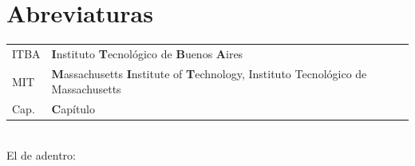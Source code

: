 \documentclass[10pt]{book}
\begin{document}
\tableofcontents 
\listoffigures			%
\listoftables			%

\chapter*{Abreviaturas}
\begin{table}[htb] 		%
	\large
	\begin{tabular}{l l}
		ITBA & \textbf{I}nstituto \textbf{T}ecnológico de \textbf{B}uenos \textbf{A}ires \\
		MIT & \textbf{M}assachusetts \textbf{I}nstitute of \textbf{T}echnology, Instituto Tecnológico de Massachusetts \\
		Cap. & \textbf{C}apítulo
	\end{tabular}
\end{table}

\mainmatter

\meaning\maketitle
\\
El de adentro:\\
\makeatletter
\meaning\HyOrg@maketitle
\makeatother
%
%

\appendix %

%



\end{document}
